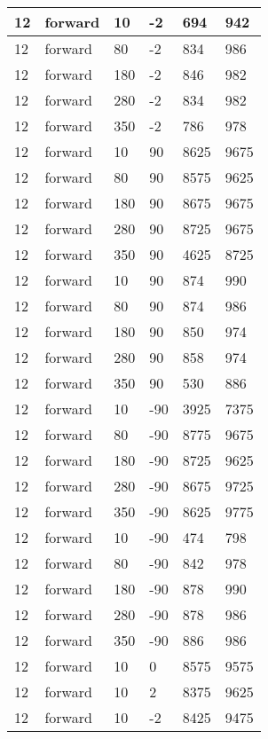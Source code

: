 \begin{table}
\begin{center}
\begin{tabular}{|l|l|l|l|l|l|}
			\hline
			12 & forward & 10 & -2 & 694 & 942 \\
			\hline
			12 & forward & 80 & -2 & 834 & 986 \\
			\hline
			12 & forward & 180 & -2 & 846 & 982 \\
			\hline
			12 & forward & 280 & -2 & 834 & 982 \\
			\hline
			12 & forward & 350 & -2 & 786 & 978 \\
			\hline
			12 & forward & 10 & 90 & 8625 & 9675 \\
			\hline
			12 & forward & 80 & 90 & 8575 & 9625 \\
			\hline
			12 & forward & 180 & 90 & 8675 & 9675 \\
			\hline
			12 & forward & 280 & 90 & 8725 & 9675 \\
			\hline
			12 & forward & 350 & 90 & 4625 & 8725 \\
			\hline
			12 & forward & 10 & 90 & 874 & 990 \\
			\hline
			12 & forward & 80 & 90 & 874 & 986 \\
			\hline
			12 & forward & 180 & 90 & 850 & 974 \\
			\hline
			12 & forward & 280 & 90 & 858 & 974 \\
			\hline
			12 & forward & 350 & 90 & 530 & 886 \\
			\hline
			12 & forward & 10 & -90 & 3925 & 7375 \\
			\hline
			12 & forward & 80 & -90 & 8775 & 9675 \\
			\hline
			12 & forward & 180 & -90 & 8725 & 9625 \\
			\hline
			12 & forward & 280 & -90 & 8675 & 9725 \\
			\hline
			12 & forward & 350 & -90 & 8625 & 9775 \\
			\hline
			12 & forward & 10 & -90 & 474 & 798 \\
			\hline
			12 & forward & 80 & -90 & 842 & 978 \\
			\hline
			12 & forward & 180 & -90 & 878 & 990 \\
			\hline
			12 & forward & 280 & -90 & 878 & 986 \\
			\hline
			12 & forward & 350 & -90 & 886 & 986 \\
			\hline
			12 & forward & 10 & 0 & 8575 & 9575 \\
			\hline
			12 & forward & 10 & 2 & 8375 & 9625 \\
			\hline
			12 & forward & 10 & -2 & 8425 & 9475 \\
			\hline

\end{tabular}
\end{center}
\end{table}
